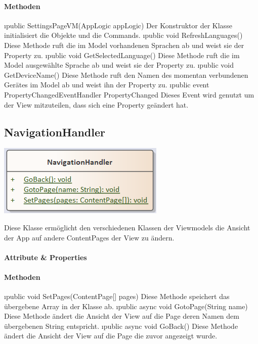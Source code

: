 \documentclass[../entwurf.tex]{subfiles}
\begin{document}
\paragraph{Methoden}
\begin{itemize}
	\i{public SettingsPageVM(AppLogic appLogic)} Der Konstruktor der Klasse initialisiert die Objekte  und die Commands.
	\i{public void RefreshLanguages()} Diese Methode ruft die im Model vorhandenen Sprachen ab und weist sie der Property  zu.
	\i{public void GetSelectedLanguage()} Diese Methode ruft die im Model ausgewählte Sprache ab und weist sie der Property  zu.
	\i{public void GetDeviceName()} Diese Methode ruft den Namen des momentan verbundenen Gerätes im Model ab und weist ihn der Property  zu.
	\i{public event PropertyChangedEventHandler PropertyChanged} Dieses Event wird genutzt um der View mitzuteilen, dass sich eine Property geändert hat.
\end{itemize}
\subsection{NavigationHandler}
\begin{minipage}{0.55\textwidth}
\includegraphics[scale=0.75]{../graphics/vm_klassen/NavigationHandler.png}
\end{minipage}
\begin{minipage}{0.45\textwidth}
Diese Klasse ermöglicht den verschiedenen Klassen der Viewmodels die Ansicht der App auf andere ContentPages der View zu ändern.
\end{minipage}
\paragraph{Attribute \& Properties}
\paragraph{Methoden}
\begin{itemize}
	\i{public void SetPages(ContentPage[] pages)} Diese Methode speichert das übergebene Array in der Klasse ab.
	\i{public async void GotoPage(String name)} Diese Methode ändert die Ansicht der View auf die Page deren Namen dem übergebenen String entspricht.
	\i{public async void GoBack()} Diese Methode ändert die Ansicht der View auf die Page die zuvor angezeigt wurde.
\end{itemize}
\end{document}
